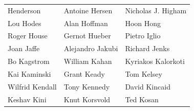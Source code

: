 \begin{tabular}{lll}
Henderson              & Antoine Hersen         & Nicholas J. Higham\\
Lou Hodes              & Alan Hoffman           & Hoon Hong\\
Roger House            & Gernot Hueber          & Pietro Iglio\\
Joan Jaffe             & Alejandro Jakubi       & Richard Jenks\\
Bo Kagstrom            & William Kahan          & Kyriakos Kalorkoti\\
Kai Kaminski           & Grant Keady            & Tom Kelsey\\
Wilfrid Kendall        & Tony Kennedy           & David Kincaid\\
Keshav Kini            & Knut Korsvold          & Ted Kosan\\
\end{tabular}
\vfill
\newpage
